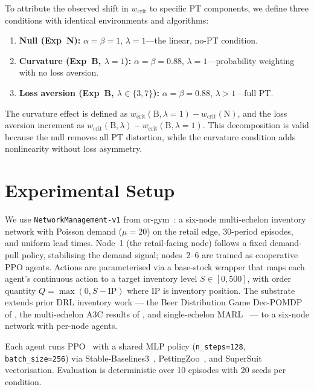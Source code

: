 \documentclass[letterpaper]{article}
\theoremstyle{plain}
\newcommand{\wcrit}{w_{\mathrm{crit}}}
\begin{document}
To attribute the observed shift in $\wcrit$ to specific PT components, we
define three conditions with identical environments and algorithms:
\begin{enumerate}
  \item \textbf{Null (Exp~N):} $\alpha{=}\beta{=}1$, $\lambda{=}1$---the
        linear, no-PT condition.
  \item \textbf{Curvature (Exp~B, $\lambda{=}1$):}
        $\alpha{=}\beta{=}0.88$, $\lambda{=}1$---probability weighting
        with no loss aversion.
  \item \textbf{Loss aversion (Exp~B, $\lambda \in \{3,7\}$):}
        $\alpha{=}\beta{=}0.88$, $\lambda > 1$---full PT.
\end{enumerate}
The curvature effect is defined as
$\wcrit(\text{B},\lambda{=}1) - \wcrit(\text{N})$,
and the loss aversion increment as
$\wcrit(\text{B},\lambda) - \wcrit(\text{B},\lambda{=}1)$.
This decomposition is valid because the null removes all PT distortion,
while the curvature condition adds nonlinearity without loss asymmetry.

\section{Experimental Setup}
\label{sec:setup}

We use \texttt{NetworkManagement-v1} from or-gym~\citep{hubbs2020orgym}:
a six-node multi-echelon inventory network with Poisson demand
($\mu{=}20$) on the retail edge, 30-period episodes, and uniform lead
times.
Node~1 (the retail-facing node) follows a fixed demand-pull policy,
stabilising the demand signal; nodes~2--6 are trained as cooperative PPO
agents.
Actions are parameterised via a base-stock wrapper that maps each
agent's continuous action to a target inventory level $S \in [0, 500]$,
with order quantity $Q = \max(0, S - \mathrm{IP})$ where $\mathrm{IP}$
is inventory position.
The substrate extends prior DRL inventory work --- the Beer Distribution
Game Dec-POMDP of \citet{oroojlooyjadid2022}, the multi-echelon A3C
results of \citet{gijsbrechts2022}, and single-echelon
MARL~\citep{marlim2023} --- to a six-node network with per-node agents.

Each agent runs PPO~\citep{schulman2017ppo} with a shared MLP policy
(\texttt{n\_steps=128}, \texttt{batch\_size=256}) via
Stable-Baselines3~\citep{raffin2021sb3}, PettingZoo~\citep{terry2021pettingzoo},
and SuperSuit~\citep{terry2020supersuit} vectorisation.
Evaluation is deterministic over 10 episodes with 20 seeds per condition.
\end{document}
